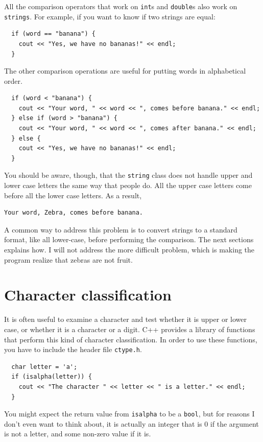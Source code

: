 All the comparison operators that work on {\tt int}s and
{\tt double}s also work on {\tt strings}.  For example,
if you want to know if two strings are equal:

\begin{verbatim}
  if (word == "banana") {
    cout << "Yes, we have no bananas!" << endl;
  }
\end{verbatim}
%
The other comparison operations are useful for putting words
in alphabetical order.

\begin{verbatim}
  if (word < "banana") {
    cout << "Your word, " << word << ", comes before banana." << endl;
  } else if (word > "banana") {
    cout << "Your word, " << word << ", comes after banana." << endl;
  } else {
    cout << "Yes, we have no bananas!" << endl;
  }
\end{verbatim}
%
You should be aware, though, that the {\tt string} class does
not handle upper and lower case letters the same way that people
do.  All the upper case letters come before all the lower case
letters.  As a result,

\begin{verbatim}
Your word, Zebra, comes before banana.
\end{verbatim}
%
A common way to address this problem is to convert strings to a
standard format, like all lower-case, before performing the
comparison.  The next sections explains how.  I will not address the
more difficult problem, which is making the program realize that
zebras are not fruit.

\section{Character classification}

It is often useful to examine a character and test whether
it is upper or lower case, or whether it is a character or
a digit.  C++ provides a library of functions that perform
this kind of character classification.  In order to use these
functions, you have to include the header file {\tt ctype.h}.

\begin{verbatim}
  char letter = 'a';
  if (isalpha(letter)) {
    cout << "The character " << letter << " is a letter." << endl;
  }
\end{verbatim}
%
You might expect the return value from {\tt isalpha} to
be a {\tt bool}, but for reasons I don't even want to think
about, it is actually an integer that is
0 if the argument is not a letter, and some non-zero value
if it is.

